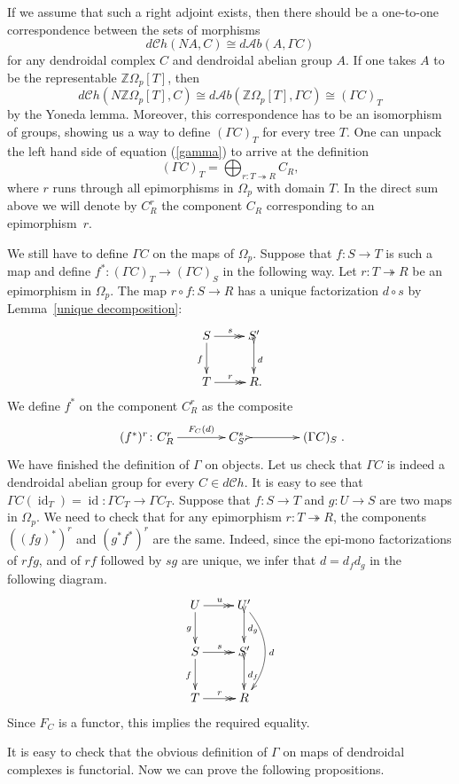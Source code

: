 \documentclass[a4paper]{amsart}
\newcommand{\Z}{{\mathbb Z}}
\theoremstyle{plain}
\theoremstyle{definition}
\theoremstyle{remark}
\DeclareMathOperator{\id}{id}
\newcommand{\rpd}{\Omega_p}
\newcommand{\To}{\longrightarrow}
\newcommand{\dCh}{d\mathcal{C}h}
\newcommand{\dAb}{d\mathcal{A}b}
\numberwithin{equation}{section}
\numberwithin{figure}{section}
\begin{document}
If we assume that such a right adjoint exists, then there should be
a one-to-one correspondence between the sets of morphisms
\[
\dCh(NA,C)\cong \dAb(A, \Gamma C)
\]
for any dendroidal complex $C$ and dendroidal abelian group $A$. If one takes $A$ to be the representable $\Z\rpd[T]$, then
\begin{equation}\label{gamma}
\dCh(N\Z\rpd[T], C)\cong\dAb(\Z\rpd[T],\Gamma C)\cong (\Gamma C)_T
\end{equation}
by the Yoneda lemma. Moreover, this correspondence has to be an isomorphism of groups, showing us a way to define $(\Gamma C)_T$ for every tree $T$.
One can unpack the left hand side of equation (\ref{gamma}) to arrive at the definition
\[
(\Gamma C)_T=\bigoplus_{r\colon T\twoheadrightarrow R}C_R,
\]
where $r$ runs through all epimorphisms in $\rpd$ with domain $T$. In the direct sum above we will denote by $C_R^r$ the component $C_R$ corresponding to an epimorphism~$r$.

We still have to define $\Gamma C$ on the maps of $\rpd$. Suppose that $f\colon S\To T$ is such a map and define $f^*\colon(\Gamma C)_T\To (\Gamma C)_S$ in the following way. Let $r\colon T\twoheadrightarrow R$ be an epimorphism in $\rpd$. The map $r\circ f\colon S\To R$ has a unique factorization $d\circ s$ by Lemma~\ref{unique decomposition}:
\[
\xymatrix{S\ar@{>>}[r]^s\ar[d]_f &S'\ar@{>->}[d]^d\\
T\ar@{>>}[r]^r & R{\rlap .}}
\]
We define $f^*$ on the component $C_R^r$ as the composite
\[
\xymatrix@C+5mm{(f^*)^r\colon C_R^r\ar[r]^-{F_C(d)} &C_{S'}^s\ar@{>->}[r] &(\Gamma C)_S}.
\]
We have finished the definition of $\Gamma$ on objects. Let us check that $\Gamma C$ is indeed a dendroidal abelian group for every $C\in \dCh$. It is easy to see that $\Gamma C(\id_T)=\id\colon \Gamma C_T\To \Gamma C_T$. Suppose that $f\colon S\To T$ and $g\colon U\To S$ are two maps in $\rpd$. We need to check that for any epimorphism $r\colon T\twoheadrightarrow R$, the components $((fg)^*)^r$ and $(g^*f^*)^r$ are the same. Indeed, since the epi-mono factorizations of $rfg$, and of $rf$ followed by $sg$ are unique, we infer that $d=d_fd_g$ in the following diagram.
\[
\xymatrix{U\ar[d]_g\ar@{>>}[r]^u &U'\ar@/^6mm/[dd]^d\ar@{>->}[d]^{d_g}\\
S\ar[d]_f\ar@{>>}[r]^s&S'\ar@{>->}[d]^{d_f}\\
T\ar@{>>}[r]^r &R}
\]
Since $F_C$ is a functor, this implies the required equality.

It is easy to check that the obvious definition of $\Gamma$ on maps of dendroidal complexes is functorial. Now we can prove the following propositions.
\end{document}
